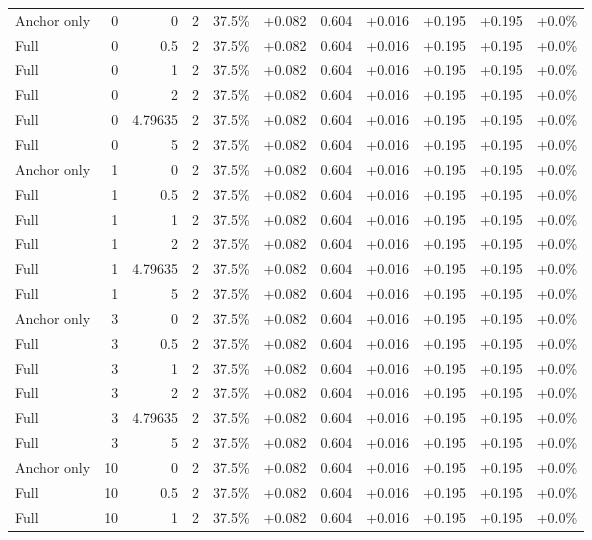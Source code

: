 \begin{table}[htbp]
\begin{tabular}{lrrrccccccc}
Anchor only & 0 & 0 & 2 & 37.5\% & +0.082 & 0.604 & +0.016 & +0.195 & +0.195 & +0.0\% \\
Full & 0 & 0.5 & 2 & 37.5\% & +0.082 & 0.604 & +0.016 & +0.195 & +0.195 & +0.0\% \\
Full & 0 & 1 & 2 & 37.5\% & +0.082 & 0.604 & +0.016 & +0.195 & +0.195 & +0.0\% \\
Full & 0 & 2 & 2 & 37.5\% & +0.082 & 0.604 & +0.016 & +0.195 & +0.195 & +0.0\% \\
Full & 0 & 4.79635 & 2 & 37.5\% & +0.082 & 0.604 & +0.016 & +0.195 & +0.195 & +0.0\% \\
Full & 0 & 5 & 2 & 37.5\% & +0.082 & 0.604 & +0.016 & +0.195 & +0.195 & +0.0\% \\
Anchor only & 1 & 0 & 2 & 37.5\% & +0.082 & 0.604 & +0.016 & +0.195 & +0.195 & +0.0\% \\
Full & 1 & 0.5 & 2 & 37.5\% & +0.082 & 0.604 & +0.016 & +0.195 & +0.195 & +0.0\% \\
Full & 1 & 1 & 2 & 37.5\% & +0.082 & 0.604 & +0.016 & +0.195 & +0.195 & +0.0\% \\
Full & 1 & 2 & 2 & 37.5\% & +0.082 & 0.604 & +0.016 & +0.195 & +0.195 & +0.0\% \\
Full & 1 & 4.79635 & 2 & 37.5\% & +0.082 & 0.604 & +0.016 & +0.195 & +0.195 & +0.0\% \\
Full & 1 & 5 & 2 & 37.5\% & +0.082 & 0.604 & +0.016 & +0.195 & +0.195 & +0.0\% \\
Anchor only & 3 & 0 & 2 & 37.5\% & +0.082 & 0.604 & +0.016 & +0.195 & +0.195 & +0.0\% \\
Full & 3 & 0.5 & 2 & 37.5\% & +0.082 & 0.604 & +0.016 & +0.195 & +0.195 & +0.0\% \\
Full & 3 & 1 & 2 & 37.5\% & +0.082 & 0.604 & +0.016 & +0.195 & +0.195 & +0.0\% \\
Full & 3 & 2 & 2 & 37.5\% & +0.082 & 0.604 & +0.016 & +0.195 & +0.195 & +0.0\% \\
Full & 3 & 4.79635 & 2 & 37.5\% & +0.082 & 0.604 & +0.016 & +0.195 & +0.195 & +0.0\% \\
Full & 3 & 5 & 2 & 37.5\% & +0.082 & 0.604 & +0.016 & +0.195 & +0.195 & +0.0\% \\
Anchor only & 10 & 0 & 2 & 37.5\% & +0.082 & 0.604 & +0.016 & +0.195 & +0.195 & +0.0\% \\
Full & 10 & 0.5 & 2 & 37.5\% & +0.082 & 0.604 & +0.016 & +0.195 & +0.195 & +0.0\% \\
Full & 10 & 1 & 2 & 37.5\% & +0.082 & 0.604 & +0.016 & +0.195 & +0.195 & +0.0\% \\

\end{tabular}
\end{table}
